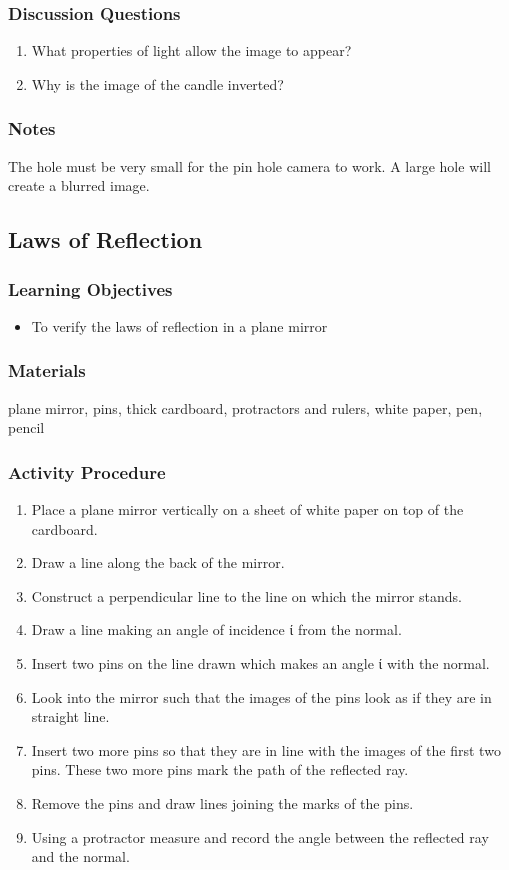 \subsubsection*{Discussion Questions}
\begin{enumerate}
\item{What properties of light allow the image to appear?}
\item{Why is the image of the candle inverted?}
\end{enumerate}

\subsubsection*{Notes}
The hole must be very small for the pin hole camera to work. A large hole will create a blurred image.  


\subsection{Laws of Reflection}

\subsubsection*{Learning Objectives}
\begin{itemize}
\item{To verify the laws of reflection in a plane mirror}
\end{itemize}

\subsubsection*{Materials}
plane mirror, pins, thick cardboard, protractors and rulers, white paper, pen, pencil

\subsubsection{Activity Procedure}
\begin{enumerate}
\item{Place a plane mirror vertically on a sheet of white paper on top of the cardboard.}
\item{Draw a line along the back of the mirror.}
\item{Construct a perpendicular line to the line on which the mirror stands.}  
\item{Draw a line making an angle of incidence ί from the normal.}
\item{Insert two pins on the line drawn which makes an angle ί with the normal.}
\item{Look into the mirror such that the images of the pins look as if they are in straight line.}
\item{Insert two more pins so that they are in line with the images of the first two pins.  These two more pins mark the path of the reflected ray.}
\item{Remove the pins and draw lines joining the marks of the pins.}
\item{Using a protractor measure and record the angle between the reflected ray and the normal.}
\end{enumerate}

